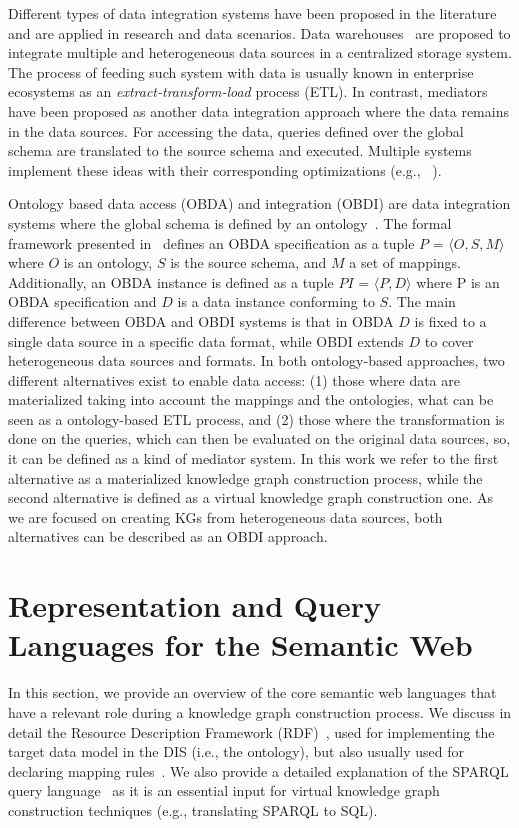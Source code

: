 Different types of data integration systems have been proposed in the literature and are applied in research and data scenarios. Data warehouses~\citep{vassiliadis2009survey} are proposed to integrate multiple and heterogeneous data sources in a centralized storage system. The process of feeding such system with data is usually known in enterprise ecosystems as an \textit{extract-transform-load} process (ETL). In contrast, mediators~\citep{wiederhold1992mediators} have been proposed as another data integration approach where the data remains in the data sources. For accessing the data, queries defined over the global schema are translated to the source schema and executed. Multiple systems implement these ideas with their corresponding optimizations (e.g., ~\cite{tsimmis1994,rajaraman1996querying,roth1997don}).

Ontology based data access (OBDA) and integration (OBDI) are data integration systems where the global schema is defined by an ontology~\citep{poggi2008linking}. The formal framework presented in~\citep{xiao2018obdasurvey} defines an OBDA specification as a tuple $P$ = $\langle O,S,M\rangle$ where $O$ is an ontology, $S$ is the source schema, and $M$ a set of mappings. Additionally, an OBDA instance is defined as a tuple $PI$ = $\langle P,D\rangle$ where P is an OBDA specification and $D$ is a data instance conforming to $S$. The main difference between OBDA and OBDI systems is that in OBDA $D$ is fixed to a single data source in a specific data format, while OBDI extends $D$ to cover heterogeneous data sources and formats. In both ontology-based approaches, two different alternatives exist to enable data access: (1) those where data are materialized taking into account the mappings and the ontologies, what can be seen as a ontology-based ETL process, and (2) those where the transformation is done on the queries, which can then be evaluated on the original data sources, so, it can be defined as a kind of mediator system. In this work we refer to the first alternative as a materialized knowledge graph construction process, while the second alternative is defined as a virtual knowledge graph construction one. As we are focused on creating KGs from heterogeneous data sources, both alternatives can be described as an OBDI approach.

\section{Representation and Query Languages for the Semantic Web}
\label{sec:soa_representation}
In this section, we provide an overview of the core semantic web languages that have a relevant role during a knowledge graph construction process. We discuss in detail the Resource Description Framework (RDF)~\citep{RDF}, used for implementing the target data model in the DIS (i.e., the ontology), but also usually used for declaring mapping rules~\citep{R2RML,dimou2014rml,michel2015translation}. We also provide a detailed explanation of the SPARQL query language~\citep{SPARQL} as it is an essential input for virtual knowledge graph construction techniques (e.g., translating SPARQL to SQL).


